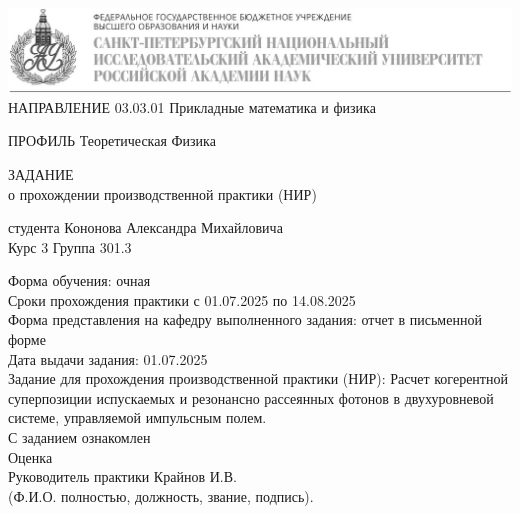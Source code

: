\documentclass[11pt]{article}    %
\begin{document}
\begin{titlepage}
    \includegraphics[scale = 0.43]{alf4.JPG}
    \\

НАПРАВЛЕНИЕ 03.03.01 Прикладные математика и физика
\par ПРОФИЛЬ Теоретическая Физика\\

\begin{center}
\begin{bf}
     ЗАДАНИЕ\\ 
     о прохождении производственной практики (НИР)
\end{bf}
  


студента Кононова Александра Михайловича \\

Курс 3 Группа 301.3
\end{center}

Форма обучения: очная \\
Сроки прохождения практики с 01.07.2025 по 14.08.2025 \\
Форма представления на кафедру выполненного задания: 
отчет в письменной форме\\
Дата выдачи задания: 01.07.2025\\
Задание для прохождения производственной практики (НИР):
Расчет когерентной суперпозиции испускаемых и резонансно рассеянных фотонов в двухуровневой системе, управляемой импульсным полем. \\
С заданием ознакомлен \\
 
Оценка \\
Руководитель практики Крайнов И.В.\\
(Ф.И.О. полностью, должность, звание, подпись).

\end{titlepage}
\end{document}
